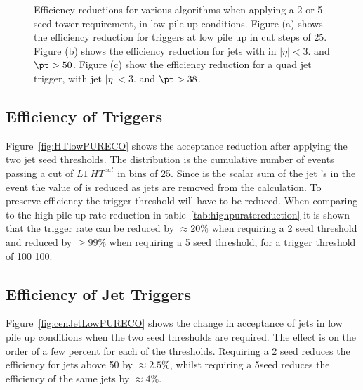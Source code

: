 \begin{figure}[h!]
    \centering
     \newline
    \caption{Efficiency reductions for various \Lone algorithms when applying a 
    2 or \unit{5}{\GeV} seed tower requirement, in low pile up 
    conditions. Figure (a) shows the efficiency reduction for \HT triggers at 
    low pile up in cut steps of \unit{25}{\GeV}. Figure (b) 
    shows the efficiency reduction for jets with in $|\eta| <3.$ and $\pt > 
    50$\GeV. Figure (c) show the efficiency reduction for a quad jet trigger, 
    with jet $|\eta| <3.$ and $\pt > 38$\GeV.}
    \label{fig:lowpuratereductionRECO}
\end{figure}



\subsection{Efficiency of \HT Triggers} %
\label{par:Efficneicy of HT triggers}
Figure~\ref{fig:HTlowPURECO} shows the acceptance reduction after applying the 
two jet seed thresholds. The distribution is the cumulative number of events 
passing a cut of $L1~HT^{cut}$ in bins of \unit{25}{\GeV}. Since \HT is the 
scalar sum of the jet \PT's in the event the value of \Lone \HT is reduced as 
jets are removed from the calculation. To preserve efficiency the \Lone trigger 
threshold will have to be reduced. When comparing to the high pile up rate 
reduction in table~\ref{tab:highpuratereduction} it is shown that the trigger 
rate can be reduced by $\approx 20\%$ when requiring a \unit{2}{\GeV} seed 
threshold and reduced by $\geq 99\%$ when requiring a \unit{5}{\GeV} seed 
threshold, for a trigger threshold of 100 \unit{100}{\GeV}.


\subsection{Efficiency of Jet Triggers} %
\label{par:Efficiency of Jet Triggers}
Figure~\ref{fig:cenJetLowPURECO} shows the change in acceptance of jets in low 
pile up conditions when the two seed thresholds are required. The effect is on 
the order of a few percent for each of the thresholds. Requiring a 
\unit{2}{\GeV} seed reduces the efficiency for jets above \unit{50}{\GeV} by 
$\approx 2.5\%$, whilst requiring a 5\GeV seed reduces the efficiency of the 
same jets by $\approx 4\%$.

